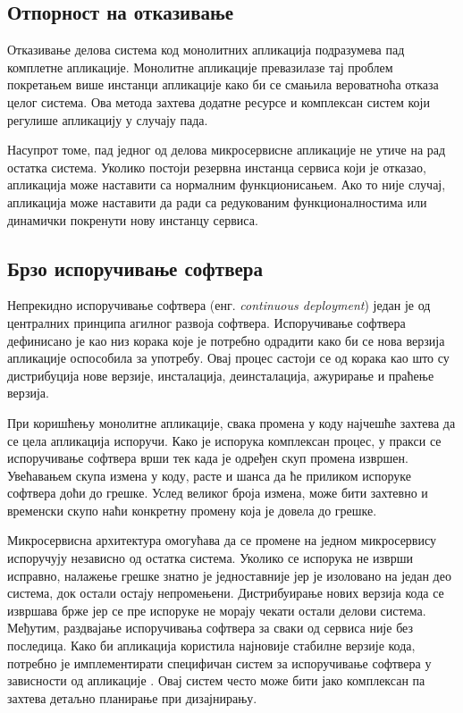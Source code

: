 \documentclass[12pt,oneside]{memoir}
\begin{document}
\subsection{Отпорност на отказивање}

Отказивање делова система код монолитних апликација подразумева пад комплетне апликације. Монолитне апликације превазилазе тај проблем покретањем више инстанци апликације како би се смањила вероватноћа отказа целог система. Ова метода захтева додатне ресурсе и комплексан систем који регулише апликацију у случају пада.

Насупрот томе, пад једног од делова микросервисне апликације не утиче на рад остатка система. Уколико постоји резервна инстанца сервиса који је отказао, апликација може наставити са нормалним функционисањем. Ако то није случај, апликација може наставити да ради са редукованим функционалностима или динамички покренути нову инстанцу сервиса.


\subsection{Брзо испоручивање софтвера}

Непрекидно испоручивање софтвера (енг. \textit{continuous deployment}) један је од централних принципа агилног развоја софтвера. Испоручивање софтвера дефинисано је као низ корака које је потребно одрадити како би се нова верзија апликације оспособила за употребу. Овај процес састоји се од корака као што су дистрибуција нове верзије, инсталација, деинсталација, ажурирање и праћење верзија.

При коришћењу монолитне апликације, свака промена у коду најчешће захтева да се цела апликација испоручи. Како је испорука комплексан процес, у пракси се испоручивање софтвера врши тек када је одређен скуп промена извршен. Увећавањем скупа измена у коду, расте и шанса да ће приликом испоруке софтвера доћи до грешке. Услед великог броја измена, може бити захтевно и временски скупо наћи конкретну промену која је довела до грешке.

Микросервисна архитектура омогућава да се промене на једном микросервису испоручују независно од остатка система. Уколико се испорука не изврши исправно, налажење грешке знатно је једноставније јер је изоловано на један део система, док остали остају непромењени. Дистрибуирање нових верзија кода се извршава брже јер се пре испоруке не морају чекати остали делови система. Међутим, раздвајање испоручивања софтвера за сваки од сервиса није без последица. Како би апликација користила најновије стабилне верзије кода, потребно је имплементирати специфичан систем за испоручивање софтвера у зависности од апликације \cite{microservicesBook}. Овај систем често може бити јако комплексан па захтева детаљно планирање при дизајнирању.
\end{document}

